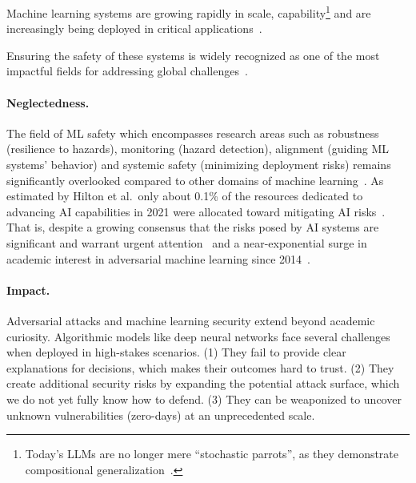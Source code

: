 \documentclass[a4paper, oneside]{discothesis}
\begin{document}
Machine learning systems are growing rapidly in scale, capability\footnote{Today's LLMs are no longer mere ``stochastic parrots'', as they demonstrate compositional generalization~\cite{qiu2024can, keysers2019measuring, Ananthaswamy2024}.} and are increasingly being deployed in critical applications~\cite{10585001, ifci2023AnalysisOT, 9099439, Khadka2022ResilientML, yilmaz2021privacy, apruzzese2023real, kumar2020legal, Cao2020HateGANAG, Nurseitov2022ApplicationOM, Zolotukhin2022AttacksAM, huggingface2024security}.

Ensuring the safety of these systems is widely recognized as one of the most impactful fields for addressing global challenges~\cite{80000hours_infosec, FLI2023pause, hendrycks2021unsolved}.

\paragraph{Neglectedness.}

The field of ML safety \textendash{} which encompasses research areas such as robustness (resilience to hazards), monitoring (hazard detection), alignment (guiding ML systems' behavior) and systemic safety (minimizing deployment risks) \textendash{} remains significantly overlooked compared to other domains of machine learning~\cite{hendrycks2021unsolved, 80000hours_infosec}. As estimated by Hilton et al.\ only about 0.1\% of the resources dedicated to advancing AI capabilities in 2021 were allocated toward mitigating AI risks~\cite{80000hours_ai_2024}. That is, despite a growing consensus that the risks posed by AI systems are significant and warrant urgent attention~\cite{FLI2023pause, hendrycks2021unsolved} and a near-exponential surge in academic interest in adversarial machine learning since 2014~\cite{carlini2019adversarial}.

\paragraph{Impact.}

Adversarial attacks and machine learning security extend beyond academic curiosity. Algorithmic models like deep neural networks face several challenges when deployed in high-stakes scenarios. (1) They fail to provide clear explanations for decisions, which makes their outcomes hard to trust. (2) They create additional security risks by expanding the potential attack surface, which we do not yet fully know how to defend. (3) They can be weaponized to uncover unknown vulnerabilities (zero-days) at an unprecedented scale.
\end{document}
